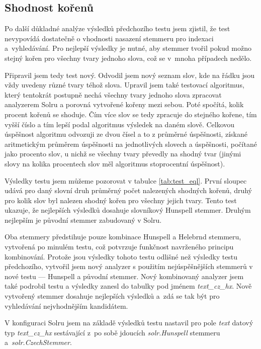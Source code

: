 \subsection{Shodnost kořenů}
Po další důkladné analýze výsledků předchozího testu jsem zjistil, že test nevypovídá dostatečně o vhodnosti nasazení stemmeru pro indexaci a~vyhledávání. Pro nejlepší výsledky je nutné, aby stemmer tvořil pokud možno stejný kořen pro všechny tvary jednoho slova, což se v~mnoha případech nedělo.

Připravil jsem tedy test nový. Odvodil jsem nový seznam slov, kde na řádku jsou vždy uvedeny různé tvary téhož slova. Upravil jsem také testovací algoritmus, který tentokrát postupně nechá všechny tvary jednoho slova  zpracovat analyzerem Solru a porovná vytvořené kořeny mezi sebou. Poté spočítá, kolik procent kořenů se shoduje. Čím více slov se tedy zpracuje do stejného kořene, tím vyšší číslo a tím lepší podal algoritmus výsledek na daném slově. Celkovou úspěšnost algoritmu odvozuji ze dvou čísel a to z průměrné úspěšnosti, získané aritmetickým průměrem úspěšnosti na jednotlivých slovech a úspěšnosti, počítané jako procento slov, u nichž se všechny tvary převedly na shodný tvar (jinými slovy na kolika procentech slov měl algoritmus stoprocentní úspěšnost).

Výsledky testu jsem můžeme pozorovat v tabulce \ref{tab:test_eql}. První sloupec udává pro daný slovní druh průměrný počet nalezených shodných kořenů, druhý pro kolik slov byl nalezen shodný kořen pro všechny jejich tvary. Tento test ukazuje, že nejlepších výsledků dosahuje slovníkový Hunspell stemmer. Druhým nejlepším je původní stemmer zabudovaný v Solru.

Oba stemmery předstihuje pouze kombinace Hunspell a Helebrnd stemmeru, vytvořená po minulém testu, což potvrzuje funkčnost navrženého principu kombinování. Protože jsou výsledky tohoto testu odlišné než výsledky testu předchozího, vytvořil jsem nový analyzer s použitím nejúspěšnějších stemmerů v nové testu --- Hunspell a původní stemmer. Nový kombinovaný analyzer jsem také podrobil testu a výsledky zanesl do tabulky pod jménem \emph{text\_cz\_hx}. Nově vytvořený stemmer dosahuje nejlepších výsledků a~zdá se tak být pro vyhledávání nejvhodnějším kandidátem.

V konfiguraci Solru jsem na základě výsledků testu nastavil pro pole \emph{text} datový typ \emph{text\_cz\_hx} sestávající z~po sobě jdoucích \emph{solr.Hunspell} stemmeru a~\emph{solr.CzechStemmer}.

